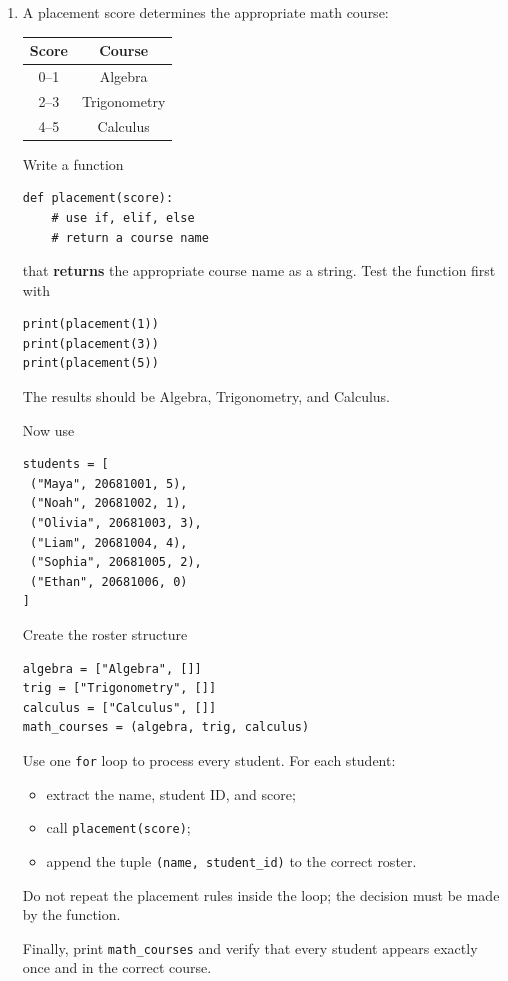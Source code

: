 \documentclass{article}
\begin{document}
\begin{enumerate}
\item A placement score determines the appropriate math course:
\begin{center}
\begin{tabular}{c|c}
\textbf{Score} & \textbf{Course} \\ \hline
0--1 & Algebra \\
2--3 & Trigonometry \\
4--5 & Calculus
\end{tabular}
\end{center}

Write a function

\begin{verbatim}
def placement(score):
    # use if, elif, else
    # return a course name
\end{verbatim}

that \textbf{returns} the appropriate course name as a string.
Test the function first with

\begin{verbatim}
print(placement(1))
print(placement(3))
print(placement(5))
\end{verbatim}

The results should be Algebra, Trigonometry, and Calculus.

Now use

\begin{verbatim}
students = [
 ("Maya", 20681001, 5),
 ("Noah", 20681002, 1),
 ("Olivia", 20681003, 3),
 ("Liam", 20681004, 4),
 ("Sophia", 20681005, 2),
 ("Ethan", 20681006, 0)
]
\end{verbatim}

Create the roster structure

\begin{verbatim}
algebra = ["Algebra", []]
trig = ["Trigonometry", []]
calculus = ["Calculus", []]
math_courses = (algebra, trig, calculus)
\end{verbatim}

Use one \texttt{for} loop to process every student.  For each student:

\begin{itemize}
\item extract the name, student ID, and score;
\item call \texttt{placement(score)};
\item append the tuple \texttt{(name, student\_id)} to the correct roster.
\end{itemize}

Do not repeat the placement rules inside the loop; the decision must be made by the function.

Finally, print \texttt{math\_courses} and verify that every student appears exactly once and in the correct course.
\end{enumerate}
\end{document}
